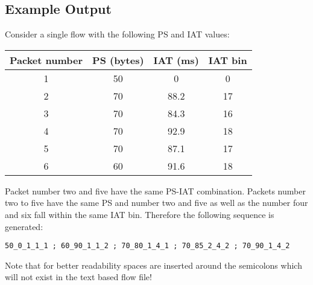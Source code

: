 \documentclass[documentation]{subfiles}
\begin{document}
\subsection{Example Output}
Consider a single flow with the following PS and IAT values:
\begin{longtable}{cccc}
    \toprule
    {\bf Packet number} & {\bf PS (bytes)} & {\bf IAT (ms)} & {\bf IAT bin}\\
    \midrule\endhead%
    1 & 50 & 0    &  0 \\
    2 & 70 & 88.2 & 17 \\
    3 & 70 & 84.3 & 16 \\
    4 & 70 & 92.9 & 18 \\
    5 & 70 & 87.1 & 17 \\
    6 & 60 & 91.6 & 18 \\
    \bottomrule
\end{longtable}
Packet number two and five have the same PS-IAT combination. Packets number two to five have the same PS and number two and five as well as the number four and six fall within the same IAT bin. Therefore the following sequence is generated:
\begin{center}
    {\tt 50\_0\_1\_1\_1 ; 60\_90\_1\_1\_2 ; 70\_80\_1\_4\_1 ; 70\_85\_2\_4\_2 ; 70\_90\_1\_4\_2}
\end{center}
Note that for better readability spaces are inserted around the semicolons which will not exist in the text based flow file!
\end{document}
